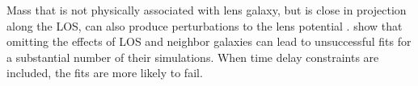 Mass that is not physically associated with lens galaxy, but is close in projection along the LOS, can also produce perturbations to the lens potential \citep[e.g.,][]{Bar-Kana96,Momcheva06, Wong11}. 
\citet{Jaroszynski14} show that omitting the effects of LOS and neighbor galaxies can lead to unsuccessful fits for a substantial number of their simulations. When time delay constraints are included, the fits are more likely to fail.